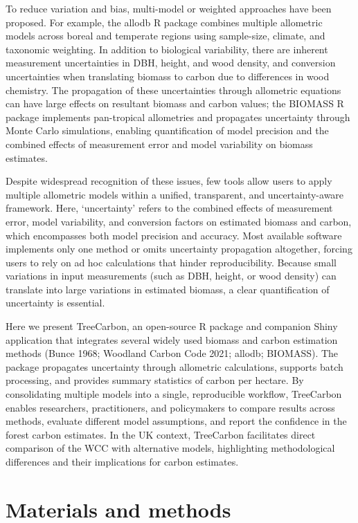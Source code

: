\documentclass[12pt,a4paper]{article}
\begin{document}
To reduce variation and bias, multi-model or weighted approaches have been proposed. For example, the allodb R package \citep{Gonzalez-Akre2022} combines multiple allometric models across boreal and temperate regions using sample-size, climate, and taxonomic weighting. In addition to biological variability, there are inherent measurement uncertainties in DBH, height, and wood density, and conversion uncertainties when translating biomass to carbon due to differences in wood chemistry. The propagation of these uncertainties through allometric equations can have large effects on resultant biomass and carbon values; the BIOMASS R package \citep{Rejou-Mechain2017} implements pan-tropical allometries and propagates uncertainty through Monte Carlo simulations, enabling quantification of model precision and the combined effects of measurement error and model variability on biomass estimates.

Despite widespread recognition of these issues, few tools allow users to apply multiple allometric models within a unified, transparent, and uncertainty-aware framework. Here, `uncertainty' refers to the combined effects of measurement error, model variability, and conversion factors on estimated biomass and carbon, which encompasses both model precision and accuracy. Most available software implements only one method or omits uncertainty propagation altogether, forcing users to rely on ad hoc calculations that hinder reproducibility. Because small variations in input measurements (such as DBH, height, or wood density) can translate into large variations in estimated biomass, a clear quantification of uncertainty is essential.

Here we present TreeCarbon, an open-source R package and companion Shiny application that integrates several widely used biomass and carbon estimation methods (Bunce 1968; Woodland Carbon Code 2021; allodb; BIOMASS). The package propagates uncertainty through allometric calculations, supports batch processing, and provides summary statistics of carbon per hectare. By consolidating multiple models into a single, reproducible workflow, TreeCarbon enables researchers, practitioners, and policymakers to compare results across methods, evaluate different model assumptions, and report the confidence in the forest carbon estimates. In the UK context, TreeCarbon facilitates direct comparison of the WCC with alternative models, highlighting methodological differences and their implications for carbon estimates.

\section{Materials and methods}
\end{document}
